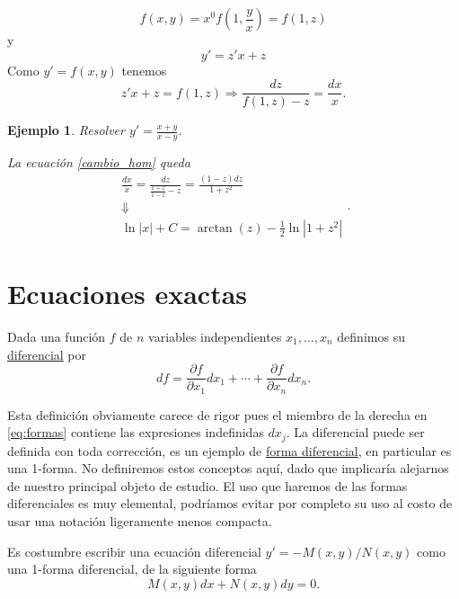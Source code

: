 \documentclass{article}
\newtheorem{ejemplo}{Ejemplo}}
\begin{document}
\[f(x,y)=x^0f\left(1,\frac{y}{x}\right)=f(1,z)\]
y
\[y'=z'x+z\]
Como $y'=f(x,y)$ tenemos
\begin{equation}\label{cambio_hom}z'x+z=f(1,z)\Longrightarrow \frac{dz}{f(1,z)-z}=\frac{dx}{x}.\end{equation}



\begin{ejemplo} Resolver $y'=\frac{x+y}{x-y}$. 

La ecuación \eqref{cambio_hom} queda
\[ \begin{array}{c} \frac{dx}{x}=\frac{dz}{\frac{1+z}{1-z}-z}=\frac{(1-z)dz}{1+z^2}\\
 \Downarrow\\
\ln|x|+C=\arctan(z)-\frac{1}{2}\ln|1+z^2|
    \end{array}.
\]

\end{ejemplo}



\section[Exactas]{Ecuaciones exactas}



\begin{definicion}[Diferencial]
 Dada una función $f$ de $n$ variables independientes $x_1,\ldots,x_n$ definimos su \href{http://es.wikipedia.org/wiki/Diferencial_de_una_función}{diferencial}
 por 
 \begin{equation}\label{eq:formas} df=\frac{\partial f}{\partial x_1}dx_1+\cdots +\frac{\partial f}{\partial x_n}dx_n.
   \end{equation}

 \end{definicion}
 
 Esta definición obviamente carece de rigor pues el miembro de la derecha en \eqref{eq:formas} contiene las expresiones indefinidas $dx_j$. 
La diferencial puede ser definida con toda corrección, es un ejemplo de \href{https://es.wikipedia.org/wiki/Forma_diferencial}{forma diferencial}, en particular  es una 1-forma. No definiremos estos conceptos aquí, dado que implicaría alejarnos de nuestro principal objeto de estudio. El uso que haremos de las formas diferenciales es muy elemental, podríamos evitar por completo su uso al costo de usar una notación ligeramente menos compacta. 

 Es costumbre escribir una ecuación diferencial $y'=-M(x,y)/N(x,y)$ como una 1-forma diferencial,  de la siguiente forma  
\begin{equation}\label{eq:ecua_forma} M(x,y)dx+N(x,y)dy=0.
 \end{equation}
\end{document}
